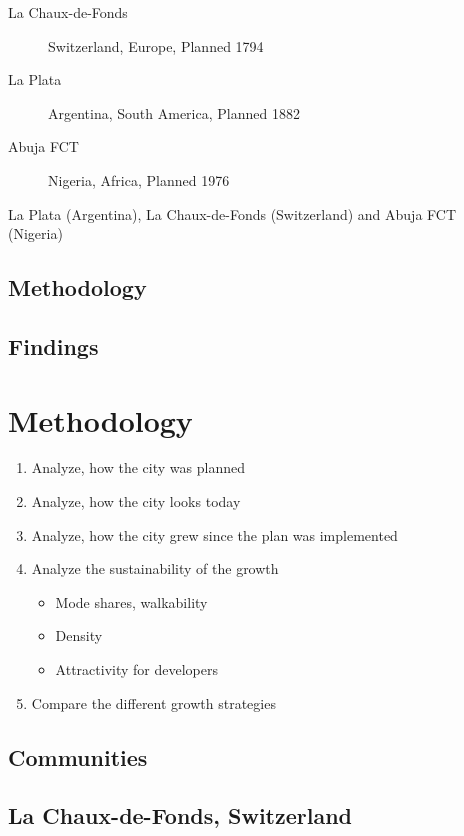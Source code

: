 \documentclass[twocolumn]{article}
\begin{document}
		\begin{description}
			\item [La Chaux-de-Fonds] Switzerland, Europe, Planned 1794
			\item [La Plata] Argentina, South America, Planned 1882
			\item [Abuja FCT] Nigeria, Africa, Planned 1976
		\end{description}
		La Plata (Argentina), La Chaux-de-Fonds (Switzerland) and Abuja FCT (Nigeria)

		\subsection{Methodology}

		\subsection{Findings}


	\clearpage
	\section{Methodology}
	
	
	\begin{enumerate}
		\item Analyze, how the city was planned
		\item Analyze, how the city looks today
		\item Analyze, how the city grew since the plan was implemented
		\item Analyze the sustainability of the growth
			\begin{itemize}
				\item Mode shares, walkability
				\item Density
				\item Attractivity for developers
			\end{itemize}
		\item Compare the different growth strategies
	\end{enumerate}


	\clearpage
	\begin{strip}
	\section{Communities}
	
		\subsection{La Chaux-de-Fonds, Switzerland}
		\end{strip}
		
\end{document}

